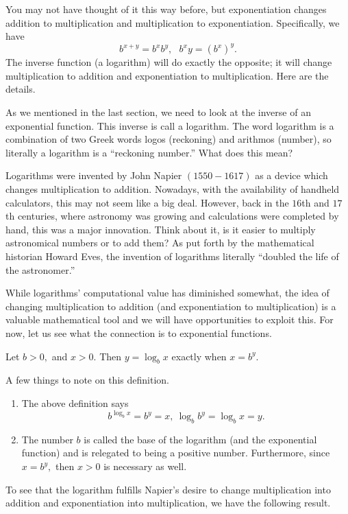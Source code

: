 You may not have thought of it this way before, but exponentiation
changes addition to multiplication and multiplication to
exponentiation.  Specifically, we have
$$
b^{x+y}=b^x b^y,\ \ \ b^xy=(b^x )^y.
$$
The inverse function (a logarithm) will do exactly the opposite; it
will change multiplication to addition and exponentiation to
multiplication.  Here are the details.

As we mentioned in the last section, we need to look at the inverse of
an exponential function.  This inverse is call a logarithm.  The word
logarithm is a combination of two Greek words logos (reckoning) and
arithmos (number), so literally a logarithm is a ``reckoning number.''
What does this mean?

Logarithms were invented by John Napier $(1550-1617)$ as a device which
changes multiplication to addition.  Nowadays, with the availability
of handheld calculators, this may not seem like a big deal.  However,
back in the $16$th and $17$th centuries, where astronomy was growing and
calculations were completed by hand, this was a major innovation.
Think about it, is it easier to multiply astronomical numbers or to
add them?  As put forth by the mathematical historian Howard Eves, the
invention of logarithms literally ``doubled the life of the
astronomer.''

While logarithms' computational value has diminished somewhat, the
idea of changing multiplication to addition (and exponentiation to
multiplication) is a valuable mathematical tool and we will have
opportunities to exploit this.  For now, let us see what the
connection is to exponential functions.


\begin{definition}{}
  Let $b>0,$ and  $x>0.$  Then $y=\log_b x$ exactly when $x=b^y.$ 
\end{definition}

A few things to note on this definition.
\begin{enumerate}
\item The above definition says
$$
  b^{\log_b x} =b^y=x ,\  \log_b b^y =\log_b x=y.
$$
\item   The number $b$ is called the base of the logarithm (and the
  exponential function) and is relegated to being a positive number.
  Furthermore, since $x=b^y,$ then $x>0$ is necessary as well.
\end{enumerate}
To see that the logarithm fulfills Napier's desire to change
multiplication into addition and exponentiation into multiplication,
we have the following result.

